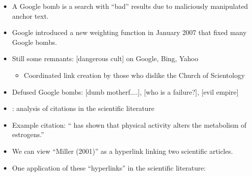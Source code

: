 \documentclass[a4paper,landscape,headrule,footrule,xetex]{foils}
\begin{document}
\begin{itemize}
\item A Google bomb is a search with ``bad'' results due to
maliciously manipulated  anchor text.
\item Google introduced a new weighting function
in January 2007
that fixed many Google bombs.
\item Still some remnants: [dangerous cult] on Google,
  Bing, Yahoo
\begin{itemize}
\item Coordinated link creation by those who dislike the
  Church of Scientology
\end{itemize}
\item Defused Google bombs: [dumb motherf....], [who is a
  failure?], [evil empire]
\end{itemize}





\begin{itemize}
\item {}: analysis of citations in the scientific literature
\item Example citation: `` has shown that physical
  activity alters the metabolism of estrogens.''
\item We can view ``Miller (2001)'' as a hyperlink linking two
  scientific articles.
\item One application of these ``hyperlinks'' in the
  scientific literature:
\end{itemize}


\end{document}
